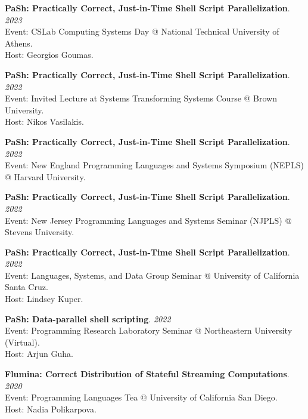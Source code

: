 \begin{minipage}{\textwidth}
\textbf{PaSh: Practically Correct, Just-in-Time Shell Script Parallelization}. \hfill {\em 2023}\\
Event: CSLab Computing Systems Day @ National Technical University of Athens.\\
 Host: Georgios Goumas.
\end{minipage}

\begin{minipage}{\textwidth}
\textbf{PaSh: Practically Correct, Just-in-Time Shell Script Parallelization}. \hfill {\em 2022}\\
Event: Invited Lecture at Systems Transforming Systems Course @ Brown University.\\
 Host: Nikos Vasilakis.
\end{minipage}

\begin{minipage}{\textwidth}
\textbf{PaSh: Practically Correct, Just-in-Time Shell Script Parallelization}. \hfill {\em 2022}\\
Event: New England Programming Languages and Systems Symposium (NEPLS) @ Harvard University.
\end{minipage}

\begin{minipage}{\textwidth}
\textbf{PaSh: Practically Correct, Just-in-Time Shell Script Parallelization}. \hfill {\em 2022}\\
Event: New Jersey Programming Languages and Systems Seminar (NJPLS) @ Stevens University.
\end{minipage}

\begin{minipage}{\textwidth}
\textbf{PaSh: Practically Correct, Just-in-Time Shell Script Parallelization}. \hfill {\em 2022}\\
Event: Languages, Systems, and Data Group Seminar @ University of California Santa Cruz.\\
 Host: Lindsey Kuper.
\end{minipage}

\begin{minipage}{\textwidth}
\textbf{PaSh: Data-parallel shell scripting}. \hfill {\em 2022}\\
Event: Programming Research Laboratory Seminar @ Northeastern University (Virtual).\\
 Host: Arjun Guha.
\end{minipage}

\begin{minipage}{\textwidth}
\textbf{Flumina: Correct Distribution of Stateful Streaming Computations}. \hfill {\em 2020}\\
Event: Programming Languages Tea @ University of California San Diego.\\
 Host: Nadia Polikarpova.
\end{minipage}

